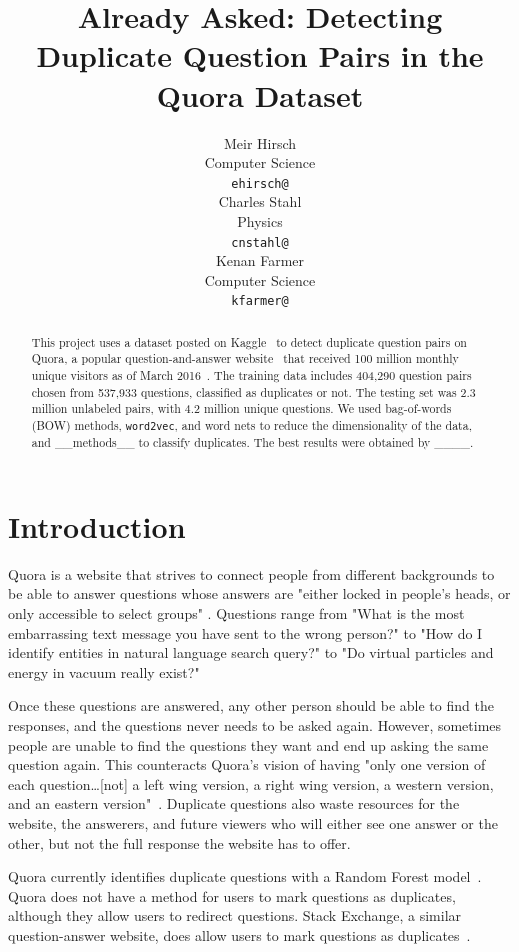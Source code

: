 \documentclass{article} %
\title{Already Asked: Detecting Duplicate Question Pairs in the Quora Dataset}
\author{
Meir Hirsch \\
Computer Science\\
\texttt{ehirsch@} \\
\And
Charles Stahl \\
Physics \\
\texttt{cnstahl@} \\
\And
Kenan Farmer\\
Computer Science \\
\texttt{kfarmer@}\\
}
\newcommand{\wordtvec}{\texttt{word2vec}}
\begin{document}
\maketitle

\begin{abstract}
This project uses a dataset posted on Kaggle~\cite{kaggleComp} to detect duplicate question pairs on Quora, a popular question-and-answer website~\cite{quora} that received 100 million monthly unique visitors as of March 2016~\cite{qvisit}. The training data includes 404,290 question pairs chosen from 537,933 questions, classified as duplicates or not. The testing set was 2.3 million unlabeled pairs, with 4.2 million unique questions. We used bag-of-words (BOW) methods, \wordtvec, and word nets to reduce the dimensionality of the data, and \_\_methods\_\_ to classify duplicates. The best results were obtained by \_\_\_\_.
\end{abstract}

\section{Introduction}

Quora is a website that strives to connect people from different backgrounds to be able to answer questions whose answers are "either locked in people’s heads, or only accessible to select groups" \cite{quora}. Questions range from "What is the most embarrassing text message you have sent to the wrong person?" to "How do I identify entities in natural language search query?" to "Do virtual particles and energy in vacuum really exist?"

Once these questions are answered, any other person should be able to find the responses, and the questions never needs to be asked again. However, sometimes people are unable to find the questions they want and end up asking the same question again. This counteracts Quora's vision of having "only one version of each question\dots [not] a left wing version, a right wing version, a western version, and an eastern version"~\cite{quora}. Duplicate questions also waste resources for the website, the answerers, and future viewers who will either see one answer or the other, but not the full response the website has to offer.

Quora currently identifies duplicate questions with a Random Forest model~\cite{kaggleComp}. Quora does not have a method for users to mark questions as duplicates, although they allow users to redirect questions. Stack Exchange, a similar question-answer website, does allow users to mark questions as duplicates~\cite{stackdup}. 
\end{document}

